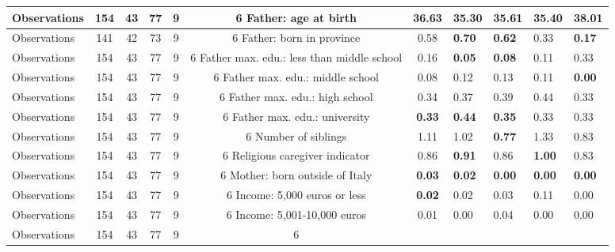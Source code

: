 \begin{tabular}{l c c c c c c }
\midrule
Observations &       154 &        43 &        77 &         9 &         6
Father: age at birth & \textbf{    36.63} &     35.30 &     35.61 &     35.40 &     38.01 \\
\midrule
Observations &       141 &        42 &        73 &         9 &         6
Father: born in province &      0.58 & \textbf{     0.70} & \textbf{     0.62} &      0.33 & \textbf{     0.17} \\
\midrule
Observations &       154 &        43 &        77 &         9 &         6
Father max. edu.: less than middle school &      0.16 & \textbf{     0.05} & \textbf{     0.08} &      0.11 &      0.33 \\
\midrule
Observations &       154 &        43 &        77 &         9 &         6
Father max. edu.: middle school &      0.08 &      0.12 &      0.13 &      0.11 & \textbf{     0.00} \\
\midrule
Observations &       154 &        43 &        77 &         9 &         6
Father max. edu.: high school &      0.34 &      0.37 &      0.39 &      0.44 &      0.33 \\
\midrule
Observations &       154 &        43 &        77 &         9 &         6
Father max. edu.: university & \textbf{     0.33} & \textbf{     0.44} & \textbf{     0.35} &      0.33 &      0.33 \\
\midrule
Observations &       154 &        43 &        77 &         9 &         6
Number of siblings &      1.11 &      1.02 & \textbf{     0.77} &      1.33 &      0.83 \\
\midrule
Observations &       154 &        43 &        77 &         9 &         6
Religious caregiver indicator &      0.86 & \textbf{     0.91} &      0.86 & \textbf{     1.00} &      0.83 \\
\midrule
Observations &       154 &        43 &        77 &         9 &         6
Mother: born outside of Italy & \textbf{     0.03} & \textbf{     0.02} & \textbf{     0.00} & \textbf{     0.00} & \textbf{     0.00} \\
\midrule
Observations &       154 &        43 &        77 &         9 &         6
Income: 5,000 euros or less & \textbf{     0.02} &      0.02 &      0.03 &      0.11 &      0.00 \\
\midrule
Observations &       154 &        43 &        77 &         9 &         6
Income: 5,001-10,000 euros &      0.01 &      0.00 &      0.04 &      0.00 &      0.00 \\
\midrule
Observations &       154 &        43 &        77 &         9 &         6

\end{tabular}

